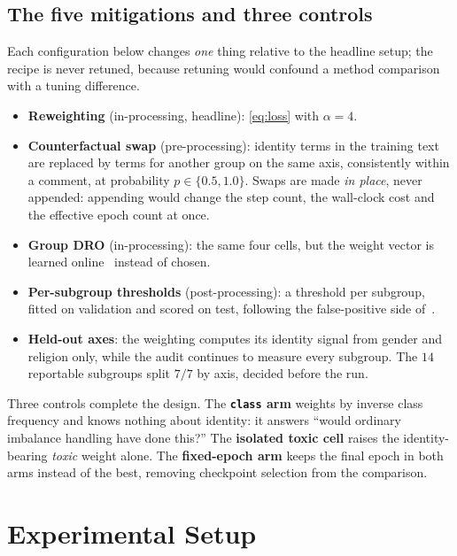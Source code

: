 \documentclass[conference]{IEEEtran}
\begin{document}
\subsection{The five mitigations and three controls}
\label{sec:arms}
Each configuration below changes \emph{one} thing relative to the headline setup;
the recipe is never retuned, because retuning would confound a method comparison
with a tuning difference.

\begin{itemize}
\item \textbf{Reweighting} (in-processing, headline): \eqref{eq:loss} with
      $\alpha = 4$.
\item \textbf{Counterfactual swap} (pre-processing): identity terms in the
      training text are replaced by terms for another group on the same axis,
      consistently within a comment, at probability $p \in \{0.5, 1.0\}$. Swaps
      are made \emph{in place}, never appended: appending would change the step
      count, the wall-clock cost and the effective epoch count at once.
\item \textbf{Group DRO} (in-processing): the same four cells, but the weight
      vector is learned online~\cite{sagawa2020} instead of chosen.
\item \textbf{Per-subgroup thresholds} (post-processing): a threshold per
      subgroup, fitted on validation and scored on test, following the
      false-positive side of~\cite{hardt2016}.
\item \textbf{Held-out axes}: the weighting computes its identity signal from
      gender and religion only, while the audit continues to measure every
      subgroup. The $14$ reportable subgroups split $7/7$ by axis, decided
      before the run.
\end{itemize}

Three controls complete the design. The \textbf{\texttt{class} arm} weights by
inverse class frequency and knows nothing about identity: it answers ``would
ordinary imbalance handling have done this?'' The \textbf{isolated toxic cell}
raises the identity-bearing \emph{toxic} weight alone. The
\textbf{fixed-epoch arm} keeps the final epoch in both arms instead of the best,
removing checkpoint selection from the comparison.

\section{Experimental Setup}
\end{document}

